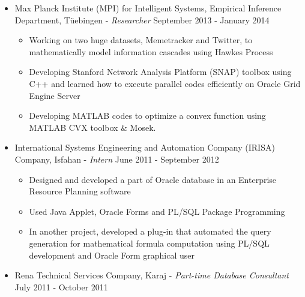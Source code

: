 \documentclass[letter]{res}
\begin{document}
\begin{resume}
\begin{itemize}
  \item Max Planck Institute (MPI) for Intelligent Systems, Empirical Inference Department, Tüebingen \newline
  - {\sl Researcher} \hfill September 2013 - January 2014\\
    \vspace{-4mm}
    \iflong
      \begin{itemize}
          \item Working on two huge datasets, Memetracker and Twitter, to mathematically model information cascades using Hawkes Process
          \item Developing Stanford Network Analysis Platform (SNAP) toolbox using C++ and learned how to execute parallel codes efficiently on Oracle Grid Engine Server
          \item Developing MATLAB codes to optimize a convex function using MATLAB CVX toolbox \& Mosek.
      \end{itemize}
    \fi
  
  \item International Systems Engineering and Automation Company (IRISA) Company, Isfahan \newline
- {\sl Intern} \hfill June 2011 - September 2012\\
	\vspace{-4mm}
    \iflong
      \begin{itemize}
          \item Designed and developed a part of Oracle database in an Enterprise Resource Planning software
          \item Used Java Applet, Oracle Forms and PL/SQL Package Programming
          \item In another project, developed a plug-in that automated the query generation for mathematical formula computation using PL/SQL development and Oracle Form graphical user
      \end{itemize}
    \fi

  \item Rena Technical Services Company, Karaj \newline
- {\sl Part-time Database Consultant} \hfill July 2011 - October 2011\\
	\vspace{-4mm}

\end{itemize}


\end{resume}
\end{document}

